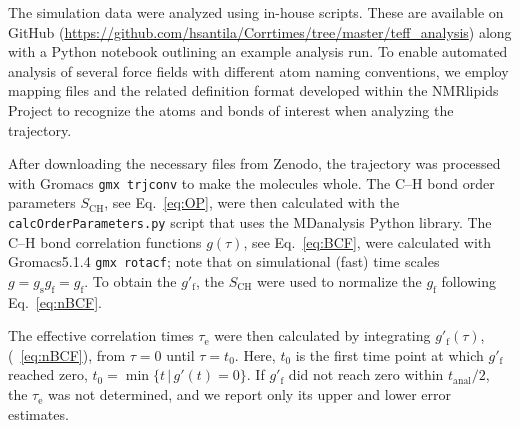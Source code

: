 \documentclass[journal=jcisd8,manuscript=article,layout=twocolumn]{achemso}
\begin{document}
The simulation data were analyzed using in-house scripts. These are available on GitHub (\url{https://github.com/hsantila/Corrtimes/tree/master/teff_analysis}) along with a Python notebook outlining an example analysis run.  To enable automated analysis of several force fields with different atom naming conventions, we employ mapping files and the related definition format developed within the NMRlipids Project to recognize the atoms and bonds of interest when analyzing the trajectory.

After downloading the necessary files from Zenodo, the trajectory was processed with Gromacs \texttt{gmx trjconv} to make the molecules whole.
The C--H bond order parameters  $S_\mathrm{CH}$, see Eq.~\eqref{eq:OP}, were then calculated with the \texttt{calcOrderParameters.py} script that uses the MDanalysis\cite{agrawal11,gowers16} Python library.
%
The \mbox{C--H} bond correlation functions
$g(\tau)$, see Eq.~\eqref{eq:BCF},
were calculated with Gromacs5.1.4\cite{abraham2015gromacs} \texttt{gmx rotacf};
note that on simulational (fast) time scales $g = g_\mathrm{s} g_\mathrm{f}= g_\mathrm{f}$.
%
To obtain the $g'_\mathrm f$,
the $S_\mathrm{CH}$ were used to
normalize the $g_\mathrm f$ following Eq.~\eqref{eq:nBCF}.

The effective correlation times $\tau_\mathrm e$ were then calculated by integrating $g'_\mathrm f(\tau)$,
(~\eqref{eq:nBCF}), from $\tau=0$ until $\tau = t_0$.
Here, $t_\mathrm 0$ is the first time point at which $g'_\mathrm f$ reached zero, $t_0 = \min
	\{
	t\,|\,g'(t)=0
	\}
$.
%
If $g'_\mathrm f$ did not reach zero within 
$t_\mathrm{anal}/2$, the 
$\tau_\mathrm e$ was not determined,
and we report only its upper and lower error estimates.
\end{document}
